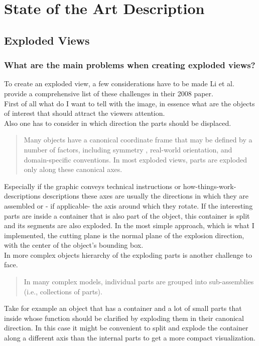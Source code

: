 \chapter{State of the Art Description}
\section{Exploded Views}
\subsection{What are the main problems when creating exploded views?}

To create an exploded view,  a few considerations have to be made Li et al. provide a comprehensive list of these challenges in their 2008 paper\cite{proc:Li:2008:AGI}.\\
First of all what do I want to tell with the image, in essence what are the objects of interest that should attract the viewers attention.\\
Also one has to consider in which direction the parts should be displaced. 
\begin{quote}
Many objects have a canonical coordinate frame that may be defined by a number of factors, including symmetry , real-world orientation, and domain-specific conventions. In most exploded views, parts are exploded only along these canonical axes.\cite{proc:Li:2008:AGI}
\end{quote}
Especially if the graphic conveys technical instructions or how-things-work-descriptions descriptions these axes are usually the directions in which they are assembled \cite{Agra03} or - if applicable- the axis around which they rotate\cite{MitraYYLA13}.
If the interesting parts are inside a container that is also part of the object, this container is split and its segments are also exploded. In the most simple approach, which is what I implemented, the cutting plane is the normal plane of the explosion direction, with the center of the object's bounding box.\\
In more complex objects hierarchy of the exploding parts is another challenge to face. 
\begin{quote}
In many complex models, individual parts are grouped into sub-assemblies (i.e., collections of parts).\cite{proc:Li:2008:AGI}
\end{quote}
Take for example an object that has a container and a lot of small parts that inside whose function should be clarified by exploding them in their canonical direction.  In this case it might be convenient to split and explode the container along a different axis than the internal parts to get a more compact visualization.\\
